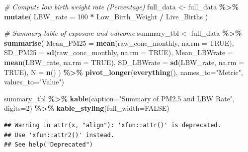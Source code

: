 \documentclass[
]{article}
\newenvironment{Shaded}{\begin{snugshade}}{\end{snugshade}}
\newcommand{\AttributeTok}[1]{\textcolor[rgb]{0.13,0.29,0.53}{#1}}
\newcommand{\CommentTok}[1]{\textcolor[rgb]{0.56,0.35,0.01}{\textit{#1}}}
\newcommand{\ConstantTok}[1]{\textcolor[rgb]{0.56,0.35,0.01}{#1}}
\newcommand{\DecValTok}[1]{\textcolor[rgb]{0.00,0.00,0.81}{#1}}
\newcommand{\FunctionTok}[1]{\textcolor[rgb]{0.13,0.29,0.53}{\textbf{#1}}}
\newcommand{\NormalTok}[1]{#1}
\newcommand{\OtherTok}[1]{\textcolor[rgb]{0.56,0.35,0.01}{#1}}
\newcommand{\SpecialCharTok}[1]{\textcolor[rgb]{0.81,0.36,0.00}{\textbf{#1}}}
\newcommand{\StringTok}[1]{\textcolor[rgb]{0.31,0.60,0.02}{#1}}
\begin{document}
\begin{Shaded}
\begin{Highlighting}[]
\CommentTok{\# Compute low birth weight rate (Percentage)}
\NormalTok{full\_data }\OtherTok{\textless{}{-}}\NormalTok{ full\_data }\SpecialCharTok{\%\textgreater{}\%}
  \FunctionTok{mutate}\NormalTok{(}
    \AttributeTok{LBW\_rate =} \DecValTok{100} \SpecialCharTok{*}\NormalTok{ Low\_Birth\_Weight }\SpecialCharTok{/}\NormalTok{ Live\_Births}
\NormalTok{  )}

\CommentTok{\#  Summary table of exposure and outcome}
\NormalTok{summary\_tbl }\OtherTok{\textless{}{-}}\NormalTok{ full\_data }\SpecialCharTok{\%\textgreater{}\%}
  \FunctionTok{summarise}\NormalTok{(}
    \AttributeTok{Mean\_PM25     =} \FunctionTok{mean}\NormalTok{(raw\_conc\_monthly, }\AttributeTok{na.rm =} \ConstantTok{TRUE}\NormalTok{),}
    \AttributeTok{SD\_PM25       =} \FunctionTok{sd}\NormalTok{(raw\_conc\_monthly, }\AttributeTok{na.rm =} \ConstantTok{TRUE}\NormalTok{),}
    \AttributeTok{Mean\_LBWrate  =} \FunctionTok{mean}\NormalTok{(LBW\_rate, }\AttributeTok{na.rm =} \ConstantTok{TRUE}\NormalTok{),}
    \AttributeTok{SD\_LBWrate    =} \FunctionTok{sd}\NormalTok{(LBW\_rate, }\AttributeTok{na.rm =} \ConstantTok{TRUE}\NormalTok{),}
    \AttributeTok{N             =} \FunctionTok{n}\NormalTok{()}
\NormalTok{  ) }\SpecialCharTok{\%\textgreater{}\%}
  \FunctionTok{pivot\_longer}\NormalTok{(}\FunctionTok{everything}\NormalTok{(), }\AttributeTok{names\_to=}\StringTok{"Metric"}\NormalTok{, }\AttributeTok{values\_to=}\StringTok{"Value"}\NormalTok{)}

\NormalTok{summary\_tbl }\SpecialCharTok{\%\textgreater{}\%}
  \FunctionTok{kable}\NormalTok{(}\AttributeTok{caption=}\StringTok{"Summary of PM2.5 and LBW Rate"}\NormalTok{, }\AttributeTok{digits=}\DecValTok{2}\NormalTok{) }\SpecialCharTok{\%\textgreater{}\%}
  \FunctionTok{kable\_styling}\NormalTok{(}\AttributeTok{full\_width=}\ConstantTok{FALSE}\NormalTok{)}
\end{Highlighting}
\end{Shaded}

\begin{verbatim}
## Warning in attr(x, "align"): 'xfun::attr()' is deprecated.
## Use 'xfun::attr2()' instead.
## See help("Deprecated")
\end{verbatim}
\end{document}
